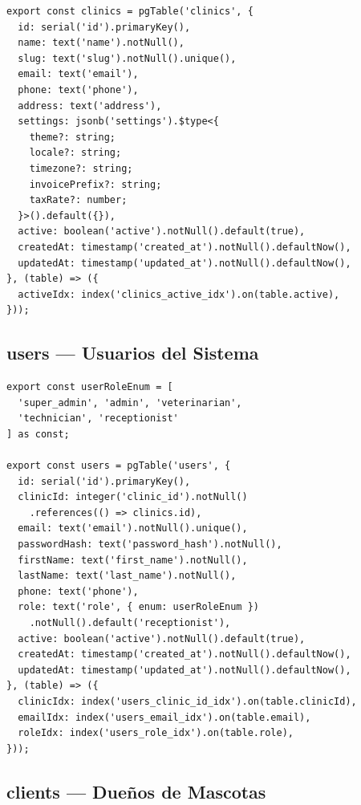 \begin{lstlisting}[style=typescript, caption=Esquema clinics]
export const clinics = pgTable('clinics', {
  id: serial('id').primaryKey(),
  name: text('name').notNull(),
  slug: text('slug').notNull().unique(),
  email: text('email'),
  phone: text('phone'),
  address: text('address'),
  settings: jsonb('settings').$type<{
    theme?: string;
    locale?: string;
    timezone?: string;
    invoicePrefix?: string;
    taxRate?: number;
  }>().default({}),
  active: boolean('active').notNull().default(true),
  createdAt: timestamp('created_at').notNull().defaultNow(),
  updatedAt: timestamp('updated_at').notNull().defaultNow(),
}, (table) => ({
  activeIdx: index('clinics_active_idx').on(table.active),
}));
\end{lstlisting}

\subsection{users --- Usuarios del Sistema}

\begin{lstlisting}[style=typescript, caption=Esquema users]
export const userRoleEnum = [
  'super_admin', 'admin', 'veterinarian',
  'technician', 'receptionist'
] as const;

export const users = pgTable('users', {
  id: serial('id').primaryKey(),
  clinicId: integer('clinic_id').notNull()
    .references(() => clinics.id),
  email: text('email').notNull().unique(),
  passwordHash: text('password_hash').notNull(),
  firstName: text('first_name').notNull(),
  lastName: text('last_name').notNull(),
  phone: text('phone'),
  role: text('role', { enum: userRoleEnum })
    .notNull().default('receptionist'),
  active: boolean('active').notNull().default(true),
  createdAt: timestamp('created_at').notNull().defaultNow(),
  updatedAt: timestamp('updated_at').notNull().defaultNow(),
}, (table) => ({
  clinicIdx: index('users_clinic_id_idx').on(table.clinicId),
  emailIdx: index('users_email_idx').on(table.email),
  roleIdx: index('users_role_idx').on(table.role),
}));
\end{lstlisting}

\subsection{clients --- Due\~nos de Mascotas}

